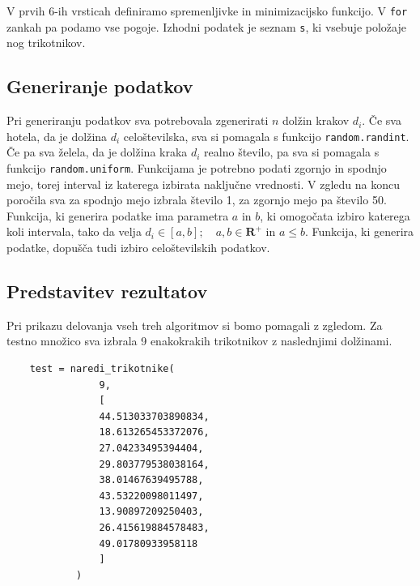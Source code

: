 \documentclass[a4paper,12pt]{article}
\theoremstyle{definition}
\theoremstyle{plain}
\begin{document}
V prvih 6-ih vrsticah definiramo spremenljivke in minimizacijsko funkcijo. V \texttt{for} zankah pa podamo vse pogoje.
Izhodni podatek je seznam \texttt{s}, ki vsebuje položaje nog trikotnikov. 

\subsection{Generiranje podatkov}
Pri generiranju podatkov sva potrebovala zgenerirati $n$ dolžin krakov $d_{i}$. Če sva hotela, da je dolžina $d_{i}$
celoštevilska, sva si pomagala s funkcijo \texttt{random.randint}. Če pa sva želela, da je dolžina kraka $d_{i}$ realno število,
pa sva si pomagala s funkcijo \texttt{random.uniform}. Funkcijama je potrebno podati zgornjo in spodnjo mejo, torej interval iz katerega izbirata naključne vrednosti.
\newpage
V zgledu na koncu poročila sva za spodnjo mejo izbrala število 1, za
zgornjo mejo pa število 50. 
Funkcija, ki generira podatke ima parametra $a$ in $b$, ki omogočata izbiro katerega koli intervala, tako da velja 
 $d_{i} \in [a,b]; \text{ }$ \mbox{$ a, b \in \mathbf{R}^+ \text{ in } a \leq b$.} Funkcija, ki generira podatke, dopušča tudi izbiro celoštevilskih podatkov.



\subsection{Predstavitev rezultatov}
Pri prikazu delovanja vseh treh algoritmov si bomo pomagali z zgledom.
Za testno množico sva izbrala 9 enakokrakih trikotnikov z naslednjimi dolžinami.

\begin{verbatim}
    test = naredi_trikotnike(
                9,
                [ 
                44.513033703890834,
                18.613265453372076,
                27.04233495394404,
                29.803779538038164,
                38.01467639495788,
                43.53220098011497,
                13.90897209250403,
                26.415619884578483,
                49.01780933958118
                ]
            )
\end{verbatim}
\end{document}
